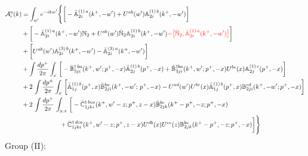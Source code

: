 \documentclass[aps,prd,amsmath,amssymb,nofootinbib]{revtex4-2}
\def\mf#1{\mathbb{#1}}
\numberwithin{equation}{section}
\begin{document}
\begin{align}
         {\cal A}^{a}_{i}(k) & = \int_{w^{\prime}}e^{-ikw^{\prime}} \Bigg\{\bigg[-\bar{\mf{A}}^{(1)\,a}_{2i}(k^{+},-w^{\prime})+U^{ab}(w^{\prime})\mf{A}^{(1)\, b}_{2i}(k^{+},
         - w^{\prime})\bigg]\notag \\ & +\bigg[-\bar{\mf{A}}^{(1)\,a}_{2i}(k^{+},-w^{\prime})\mf{N}_{2}+ U^{ab}(w^{\prime})\bar{\mf{N}}_{2}\mf{A}^{ (1)\, b}_{2i}(k^{+},-w^{\prime}){\color{red}-\big[\bar{\mf{N}}_{2},\bar{\mf{A}}^{(1)\,a}_{2i}(k^{+},-w^{\prime})\big]}\bigg]\notag 
         \\ & +\bigg[U^{ab}(w^{\prime})\mf{A}^{(3)\, b}_{2i}(k^{+},- w^{\prime})-\Bar{\mf{A}}^{(3)\, a}_{2i}(k^{+}, - w^{\prime})\bigg]\notag 
         \\ & 
         +\int \frac{dp^{+}}{2\pi}\int_{x}\,\bigg[-\Bar{\mf{B}}^{\dagger\, ba}_{3ji}(k^{+}, w^{\prime}; p^{+}, -x)\Bar{\mf{A}}^{(1)\,b}_{2j}(p^{+}, - x)
         + \Bar{\mf{B}}^{\dagger ba}_{3ji}(k^{+},w^{\prime}; p^{+},-x) U^{bc}(x) \mf{A}^{(1)\, c}_{2j}(p^{+},- x)\bigg]\notag
         \\ & 
         +2\,\int \frac{dp^{+}}{2\pi}\int_{x}\,\bigg[ \Bar{\mf{A}}^{(1)\, b}_{1j}(p^{+}, x)\Bar{\mf{B}}^{ba}_{2ji}(k^{+},-w^{\prime};\,p^{+}, -x) -U^{ad}(w^\prime)U^{bc}(x) \bar{\mf{A}}^{(1)\, b}_{1j}(p^+,x) {\mf{B}}^{cd}_{2ji} (k^+, -w^\prime;p^+, -x)\bigg]\notag 
         \\ & 
         +2\, \int \frac{dp^{+}}{2\pi}\,\int_{x,z}\, \bigg[-\Bar{\mf{C}}^{\dagger\, bca}_{1jki}(k^{+},w^{\prime}-z;p^{+},z-x)\Bar{\mf{B}}^{bc}_{2jk}(k^{+}-p^{+},- z;p^{+},-x)
         \notag \\ & \qquad \qquad \qquad  +\bar{\mf{C}}^{\dagger\, dca}_{1jki}(k^+,w^\prime-z; p^+, z-x)  
                 U^{db}(x)
                 U^{ce}(z) 
                {\mf{B}}^{be}_{2jk} (k^{+}-p^+, -z; p^+, -x) \bigg] \Bigg\}
    \end{align}   
Group (II): 
\end{document}
